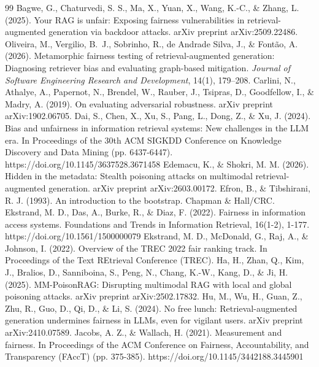 \documentclass[authoryear,review,3p,times]{elsarticle}
\begin{document}
\begin{thebibliography}{99}
 Bagwe, G., Chaturvedi, S. S., Ma, X., Yuan, X., Wang, K.-C., \& Zhang, L. (2025). Your RAG is unfair: Exposing fairness vulnerabilities in retrieval-augmented generation via backdoor attacks. arXiv preprint arXiv:2509.22486.
 Oliveira, M., Vergilio, B.~J., Sobrinho, R., de Andrade Silva, J., \& Font\~ao, A. (2026). Metamorphic fairness testing of retrieval-augmented generation: Diagnosing retriever bias and evaluating graph-based mitigation. \emph{Journal of Software Engineering Research and Development}, 14(1), 179--208.
 Carlini, N., Athalye, A., Papernot, N., Brendel, W., Rauber, J., Tsipras, D., Goodfellow, I., \& Madry, A. (2019). On evaluating adversarial robustness. arXiv preprint arXiv:1902.06705.
 Dai, S., Chen, X., Xu, S., Pang, L., Dong, Z., \& Xu, J. (2024). Bias and unfairness in information retrieval systems: New challenges in the LLM era. In Proceedings of the 30th ACM SIGKDD Conference on Knowledge Discovery and Data Mining (pp. 6437-6447). https://doi.org/10.1145/3637528.3671458
 Edemacu, K., \& Shokri, M. M. (2026). Hidden in the metadata: Stealth poisoning attacks on multimodal retrieval-augmented generation. arXiv preprint arXiv:2603.00172.
 Efron, B., \& Tibshirani, R. J. (1993). An introduction to the bootstrap. Chapman \& Hall/CRC.
 Ekstrand, M. D., Das, A., Burke, R., \& Diaz, F. (2022). Fairness in information access systems. Foundations and Trends in Information Retrieval, 16(1-2), 1-177. https://doi.org/10.1561/1500000079
 Ekstrand, M. D., McDonald, G., Raj, A., \& Johnson, I. (2022). Overview of the TREC 2022 fair ranking track. In Proceedings of the Text REtrieval Conference (TREC).
 Ha, H., Zhan, Q., Kim, J., Bralios, D., Sanniboina, S., Peng, N., Chang, K.-W., Kang, D., \& Ji, H. (2025). MM-PoisonRAG: Disrupting multimodal RAG with local and global poisoning attacks. arXiv preprint arXiv:2502.17832.
 Hu, M., Wu, H., Guan, Z., Zhu, R., Guo, D., Qi, D., \& Li, S. (2024). No free lunch: Retrieval-augmented generation undermines fairness in LLMs, even for vigilant users. arXiv preprint arXiv:2410.07589.
 Jacobs, A. Z., \& Wallach, H. (2021). Measurement and fairness. In Proceedings of the ACM Conference on Fairness, Accountability, and Transparency (FAccT) (pp. 375-385). https://doi.org/10.1145/3442188.3445901

\end{thebibliography}
\end{document}
